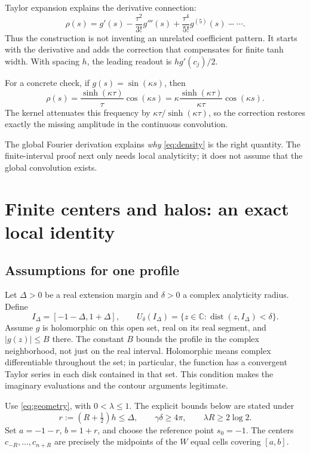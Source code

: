 \documentclass[11pt]{article}
\newcommand{\C}{\mathbb C}
\begin{document}
Taylor expansion explains the derivative connection:
\begin{equation}
 \rho(s)=g'(s)-\frac{\tau^2}{3!}g'''(s)
 +\frac{\tau^4}{5!}g^{(5)}(s)-\cdots.
 \label{eq:density-taylor}
\end{equation}
Thus the construction is not inventing an unrelated coefficient pattern. It starts with the derivative and adds the correction that compensates for finite tanh width. With spacing $h$, the leading readout is $h g'(c_j)/2$.

For a concrete check, if $g(s)=\sin(\kappa s)$, then
\[
 \rho(s)=\frac{\sinh(\kappa\tau)}\tau\cos(\kappa s)
 =\kappa\frac{\sinh(\kappa\tau)}{\kappa\tau}\cos(\kappa s).
\]
The kernel attenuates this frequency by $\kappa\tau/\sinh(\kappa\tau)$, so the correction restores exactly the missing amplitude in the continuous convolution.

The global Fourier derivation explains \emph{why} \eqref{eq:density} is the right quantity. The finite-interval proof next only needs local analyticity; it does not assume that the global convolution exists.

\section{Finite centers and halos: an exact local identity}
\subsection{Assumptions for one profile}

Let $\Delta>0$ be a real extension margin and $\delta>0$ a complex analyticity radius. Define
\[
 I_\Delta=[-1-\Delta,1+\Delta],\qquad
 U_\delta(I_\Delta)=\{z\in\C:\operatorname{dist}(z,I_\Delta)<\delta\}.
\]
Assume $g$ is holomorphic on this open set, real on its real segment, and $|g(z)|\le B$ there. The constant $B$ bounds the profile in the complex neighborhood, not just on the real interval.
Holomorphic means complex differentiable throughout the set; in particular, the function has a convergent Taylor series in each disk contained in that set. This condition makes the imaginary evaluations and the contour arguments legitimate.

Use \eqref{eq:geometry}, with $0<\lambda\le1$. The explicit bounds below are stated under
\begin{equation}
 r:=(R+\tfrac12)h\le\Delta,\qquad
 \gamma\delta\ge4\pi,\qquad
 \lambda R\ge2\log2.
 \label{eq:admissibility}
\end{equation}
Set $a=-1-r$, $b=1+r$, and choose the reference point $s_0=-1$. The centers $c_{-R},\ldots,c_{n+R}$ are precisely the midpoints of the $W$ equal cells covering $[a,b]$.
\end{document}

